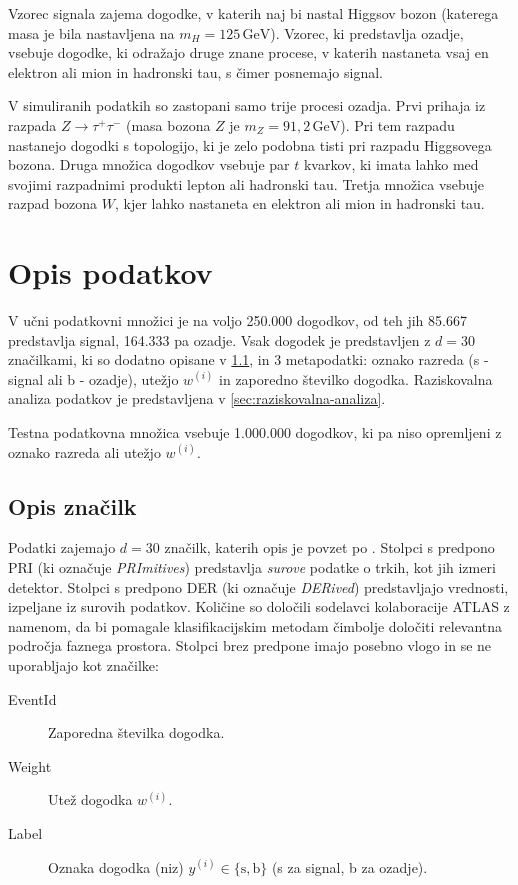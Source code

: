 \documentclass[11pt,a4paper,openany]{book}
\begin{document}
Vzorec signala zajema dogodke, v katerih naj bi nastal Higgsov bozon (katerega masa je bila nastavljena na $m_H = 125\,\text{GeV}$). Vzorec, ki predstavlja ozadje, vsebuje dogodke, ki odražajo druge znane procese, v katerih nastaneta vsaj en elektron ali mion in hadronski tau, s čimer posnemajo signal.

V simuliranih podatkih so zastopani samo trije procesi ozadja. Prvi prihaja iz razpada $Z \rightarrow \tau^+\tau^-$ (masa bozona $Z$ je $m_Z = 91,2\,\text{GeV}$). Pri tem razpadu nastanejo dogodki s topologijo, ki je zelo podobna tisti pri razpadu Higgsovega bozona. Druga množica dogodkov vsebuje par $t$ kvarkov, ki imata lahko med svojimi razpadnimi produkti lepton ali hadronski tau. Tretja množica vsebuje razpad bozona $W$, kjer lahko nastaneta en elektron ali mion in hadronski tau. 

\section{Opis podatkov}
\label{ch:opis_podatkov}

V učni podatkovni množici je na voljo 250.000 dogodkov, od teh jih 85.667 predstavlja signal, 164.333 pa ozadje. Vsak dogodek je predstavljen z $d = 30$ značilkami, ki so dodatno opisane v \ref{sec:opis-znacilk}, in 3 metapodatki: oznako razreda (s - signal ali b - ozadje), utežjo $w^{(i)}$ in zaporedno številko dogodka. Raziskovalna analiza podatkov je predstavljena v \ref{sec:raziskovalna-analiza}.

Testna podatkovna množica vsebuje 1.000.000 dogodkov, ki pa niso opremljeni z oznako razreda ali utežjo $w^{(i)}$. 

\subsection{Opis značilk}
\label{sec:opis-znacilk}
Podatki zajemajo $d = 30$ značilk, katerih opis je povzet po \cite{Adam-Bourdarios14}. Stolpci s predpono PRI (ki označuje \textit{PRImitives}) predstavlja \textit{surove} podatke o trkih, kot jih izmeri detektor. Stolpci s predpono DER (ki označuje \textit{DERived}) predstavljajo vrednosti, izpeljane iz surovih podatkov. Količine so določili sodelavci kolaboracije ATLAS z namenom, da bi pomagale klasifikacijskim metodam čimbolje določiti relevantna področja faznega prostora. Stolpci brez predpone imajo posebno vlogo in se ne uporabljajo kot značilke:

\begin{changemargin}{0.5cm}{0.0cm} 
\begin{description}
	\item [EventId] 	Zaporedna številka dogodka.
	\item [Weight]  	Utež dogodka $w^{(i)}$.
	\item [Label] 		Oznaka dogodka (niz) $y^{(i)} \in \{\text{s}, \text{b}\}$ (s za signal, b za ozadje).	
\end{description}
\end{changemargin}
\end{document}
